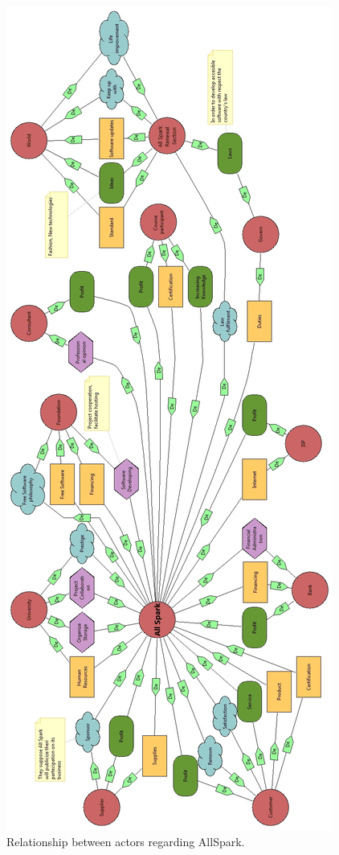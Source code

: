 \begin{figure}
\centering
\includegraphics[scale=0.30]{Si_star/img/i_star}
\caption{Relationship between actors regarding AllSpark.}
\label{img:i_star}
\end{figure}


